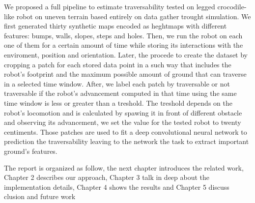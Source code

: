 \documentclass[../document.tex]{subfiles}
\begin{document}
We proposed a full pipeline to estimate traversability tested on legged crocodile-like robot on uneven terrain based entirely on data gather trought simulation. We first generated thirty synthetic maps encoded as heghtmaps with different features: bumps, walls, slopes, steps and holes. Then, we run the robot on each one of them for a certain amount of time while storing its interactions with the enviroment, position and orientation. Later, the procede to create the dataset by cropping a patch for each stored data point in a such way that includes the robot's footprint and the maximum possible amount of ground that can traverse in a selected time window. After, we label each patch by traversable or not traversable if the robot's advancement computed in that time using the same time window is less or greater than a treshold. The treshold depends on the robot's locomotion and is calculated by spawing it in front of different obstacle and observing its advancement, we set the value for the tested robot to twenty centiments. Those patches are used to fit a deep convolutional neural network to prediction the traversability leaving to the network the task to extract important ground's features.

The report is organized as follow, the next chapter  introduces the related work, Chapter 2 describes our approach, Chapter 3 talk in deep about the implementation details,
Chapter 4 shows the results and Chapter 5 discuss clusion and future work
\end{document}
